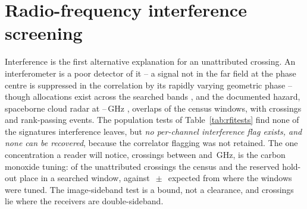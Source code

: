 \section{Radio-frequency interference screening}
\label{app:rfi}

Interference is the first alternative explanation for an unattributed
crossing. An interferometer is a poor detector of it -- a signal not in the
far field at the phase centre is suppressed in the correlation by its rapidly
varying geometric phase -- though allocations exist across the searched bands
\citep{ITU2024}, and the documented hazard, spaceborne cloud radar at
\RadarLo--\RadarHi\,GHz \citep{CloudSat2002,EarthCARE2023,ALMAMemo504},
overlaps \RadarNWin{} of the \RadarNTot{} census windows, with
\RadarNCross{} crossings and \RadarNStage{} rank-passing events. The
population tests of Table~\ref{tab:rfitests} find none of the signatures
interference leaves, but \emph{no per-channel interference flag exists, and
none can be recovered}, because the correlator flagging was not retained.
The one concentration a reader will notice, \TlBandAll{} crossings between
\TlBandLo{} and \TlBandHi\,GHz, is the carbon monoxide tuning: \TlBandObs{} of
the \TlBandNSub{} unattributed crossings the census and the reserved hold-out
place in a searched window, against \TlBandNull$\,\pm\,$\TlBandNullSd{}
expected from where the windows were tuned. The image-sideband test is a
bound, not a clearance, and \ImNDsb{} crossings lie where the receivers are
double-sideband.

